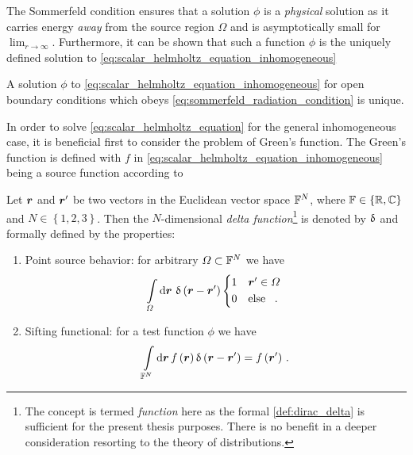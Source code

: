 The Sommerfeld condition ensures that a solution $\phi$ is a \emph{physical}
solution as it carries energy \emph{away} from the source region $\Omega$ and is
asymptotically small for $\lim_{r \to \infty}$.
Furthermore, it can be shown \cite[p190]{Sommerfeld1964} that such a function
$\phi$ is the uniquely defined solution to
\eqref{eq:scalar_helmholtz_equation_inhomogeneous}
\begin{theorem}[Uniqueness]
	A solution $\phi$ to \eqref{eq:scalar_helmholtz_equation_inhomogeneous}
	for open boundary conditions which obeys
	\eqref{eq:sommerfeld_radiation_condition} is unique.
\end{theorem}

In order to solve \eqref{eq:scalar_helmholtz_equation} for the general
inhomogeneous case, it is beneficial first to consider the problem of Green's
function.
The Green's function is defined with $f$ in
\eqref{eq:scalar_helmholtz_equation_inhomogeneous} being a source function
according to
\begin{definition}\label{def:dirac_delta}
	Let $\robs$ and $\rsrc$ be two vectors in the Euclidean vector space
	$\mathbb{F}^N$, where $\mathbb{F} \in \left\{\mathbb{R}, \mathbb{C}\right\}$ and
	$N \in \left\{1, 2, 3\right\}$.
	Then the $N$-dimensional \emph{delta function}\footnote{The concept is
	termed \emph{function} here as the formal \cref{def:dirac_delta} is
	sufficient for the present thesis purposes.
	There is no benefit in a deeper consideration resorting to the theory of
	distributions\cite{Strichartz2003}.} is denoted by
	$\operatorname{\updelta}$ and formally defined by the properties:
	\begin{enumerate}[label=(\alph*)]
		\item Point source behavior: for arbitrary $\Omega \subset \mathbb{F}^N$ we
		have
		\begin{equation}
			\int\limits_{\Omega} \dd \pvec{r} \,
			\diracDelta \left( \robs - \rsrc \right)
			\begin{cases*}
				1 & $\rsrc \in \Omega$ \\
				0 & \text{else} \, .
			\end{cases*} 
		\end{equation}
		\item Sifting functional: for a test function $\phi$ 
		\cite{Strichartz2003}\cite[35]{Olver2010} we have
		\begin{equation}\label{eq:delta_filter_property}
			\int\limits_{\F^N} \dd \pvec{r} \,
			f \left( \robs \right)
			\diracDelta \left(\robs-\rsrc\right) =
			f \left( \rsrc \right)
			\, .
		\end{equation}
	\end{enumerate}
\end{definition}

